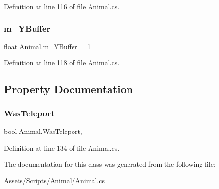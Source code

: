 Definition at line 116 of file Animal.\+cs.

\mbox{\label{class_animal_a052f059393b9e50b56bb4b5d16ef8c8d}} 
\subsubsection{\texorpdfstring{m\+\_\+\+Y\+Buffer}{m\_YBuffer}}
{\footnotesize\ttfamily float Animal.\+m\+\_\+\+Y\+Buffer = 1}



Definition at line 118 of file Animal.\+cs.



\subsection{Property Documentation}
\mbox{\label{class_animal_a461c4f050bcad5e24677b05a80fbcaf4}} 
\subsubsection{\texorpdfstring{Was\+Teleport}{WasTeleport}}
{\footnotesize\ttfamily bool Animal.\+Was\+Teleport\hspace{0.3cm}{\ttfamily [get]}, {\ttfamily [set]}}



Definition at line 134 of file Animal.\+cs.



The documentation for this class was generated from the following file\+:\begin{DoxyCompactItemize}
\item 
Assets/\+Scripts/\+Animal/\mbox{\hyperlink{_animal_8cs}{Animal.\+cs}}\end{DoxyCompactItemize}
